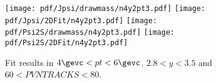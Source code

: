 \begin{figure}[H]
\begin{center}
\texttt{[image: pdf/Jpsi/drawmass/n4y2pt3.pdf]}
\texttt{[image: pdf/Jpsi/2DFit/n4y2pt3.pdf]}
\vspace*{-0.5cm}
\texttt{[image: pdf/Psi2S/drawmass/n4y2pt3.pdf]}
\texttt{[image: pdf/Psi2S/2DFit/n4y2pt3.pdf]}
\vspace*{-0.5cm}
\end{center}
\caption{Fit results in $4\gevc<pt<6\gevc$, $2.8<y<3.5$ and $60<PVNTRACKS<80$.}
\label{Fitn4y2pt3}
\end{figure}
